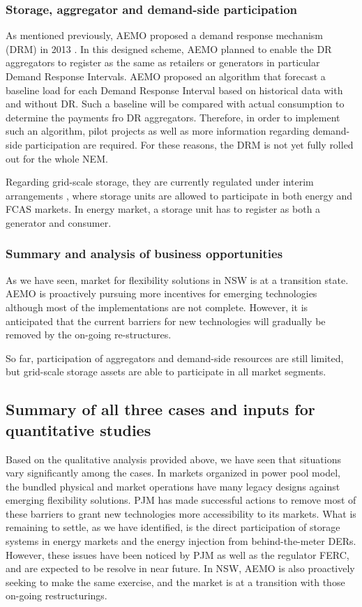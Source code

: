\subsubsection{Storage, aggregator and demand-side participation}

As mentioned previously, AEMO proposed a demand response mechanism (DRM) in 2013 \cite{AEMO_DR_1}. In this designed scheme, AEMO planned to enable the DR aggregators to register as the same as retailers or generators in particular Demand Response Intervals. AEMO proposed an algorithm that forecast a baseline load for each Demand Response Interval  based on historical data with and without DR. Such a baseline will be compared with actual consumption to determine the payments fro DR aggregators. Therefore, in order to implement such an algorithm, pilot projects \cite{AEMO_DR_Pilot} as well as more information regarding demand-side participation \cite{AEMO_DR} are required. For these reasons, the DRM is not yet fully rolled out for the whole NEM.

Regarding grid-scale storage, they are currently regulated under interim arrangements \cite{AEMO_BESS}, where storage units are allowed to participate in both energy and FCAS markets. In energy market, a storage unit has to register as both a generator and consumer. 

\subsubsection{Summary and analysis of business opportunities}

As we have seen, market for flexibility solutions in NSW is at a transition state. AEMO is proactively pursuing more incentives for emerging technologies although most of the implementations are not complete. However, it is anticipated that the current barriers for new technologies will gradually be removed by the on-going re-structures.

So far, participation of aggregators and demand-side resources are still limited, but grid-scale storage assets are able to participate in all market segments.


\subsection{Summary of all three cases and inputs for quantitative studies}

Based on the qualitative analysis provided above, we have seen that situations vary significantly among the cases. In markets organized in power pool model, the bundled physical and market operations have many legacy designs against emerging flexibility solutions. PJM has made successful actions to remove most of these barriers to grant new technologies more accessibility to its markets. What is remaining to settle, as we have identified, is the direct participation of storage systems in energy markets and the energy injection from behind-the-meter DERs. However, these issues have been noticed by PJM as well as the regulator FERC, and are expected to be resolve in near future. In NSW, AEMO is also proactively seeking to make the same exercise, and the market is at a transition with those on-going restructurings.

